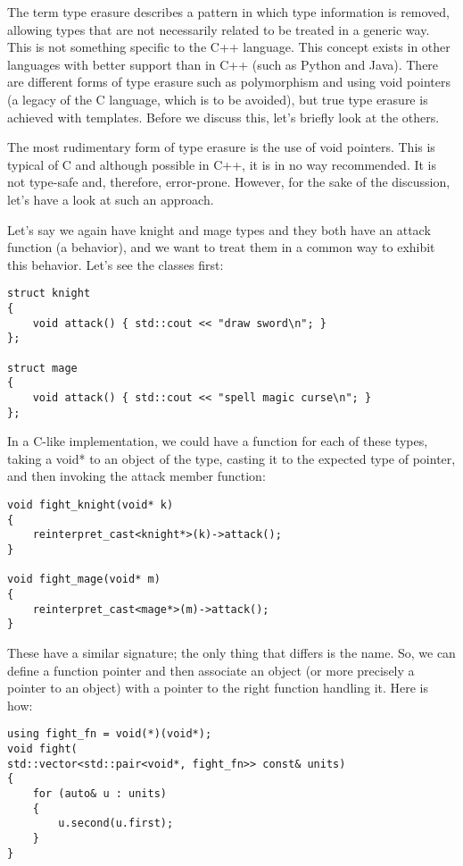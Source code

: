 The term type erasure describes a pattern in which type information is removed, allowing types that are not necessarily related to be treated in a generic way. This is not something specific to the C++ language. This concept exists in other languages with better support than in C++ (such as Python and Java). There are different forms of type erasure such as polymorphism and using void pointers (a legacy of the C language, which is to be avoided), but true type erasure is achieved with templates. Before we discuss this, let’s briefly look at the others.

The most rudimentary form of type erasure is the use of void pointers. This is typical of C and although possible in C++, it is in no way recommended. It is not type-safe and, therefore, error-prone. However, for the sake of the discussion, let’s have a look at such an approach.

Let’s say we again have knight and mage types and they both have an attack function (a behavior), and we want to treat them in a common way to exhibit this behavior.
Let’s see the classes first:

\begin{lstlisting}[style=styleCXX]
struct knight
{
	void attack() { std::cout << "draw sword\n"; }
};

struct mage
{
	void attack() { std::cout << "spell magic curse\n"; }
};
\end{lstlisting}

In a C-like implementation, we could have a function for each of these types, taking a void* to an object of the type, casting it to the expected type of pointer, and then invoking the attack member function:

\begin{lstlisting}[style=styleCXX]
void fight_knight(void* k)
{
	reinterpret_cast<knight*>(k)->attack();
}

void fight_mage(void* m)
{
	reinterpret_cast<mage*>(m)->attack();
}
\end{lstlisting}

These have a similar signature; the only thing that differs is the name. So, we can define a function pointer and then associate an object (or more precisely a pointer to an object) with a pointer to the right function handling it. Here is how:

\begin{lstlisting}[style=styleCXX]
using fight_fn = void(*)(void*);
void fight(
std::vector<std::pair<void*, fight_fn>> const& units)
{
	for (auto& u : units)
	{
		u.second(u.first);
	}
}
\end{lstlisting}

